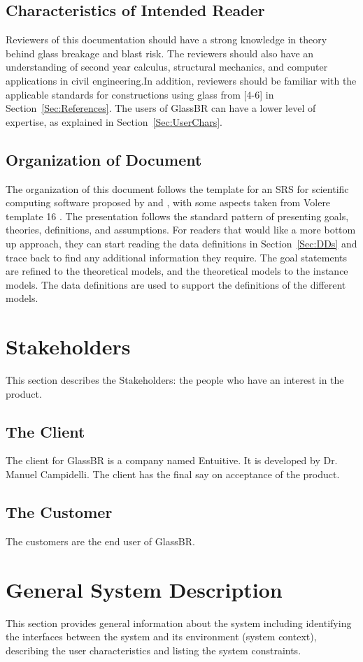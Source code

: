 \documentclass[12pt]{article}
\begin{document}
\subsection{Characteristics of Intended Reader}
\label{Sec:ReaderChars}
Reviewers of this documentation should have a strong knowledge in theory behind glass breakage and blast risk. The reviewers should also have an understanding of second year calculus, structural mechanics, and computer applications in civil engineering.In addition, reviewers should be familiar with the applicable standards for constructions using glass from {[}4-6{]} in Section~\ref{Sec:References}. The users of GlassBR can have a lower level of expertise, as explained in Section~\ref{Sec:UserChars}.
\subsection{Organization of Document}
\label{Sec:DocOrg}
The organization of this document follows the template for an SRS for scientific computing software proposed by \cite{koothoor2013} and \cite{smithLai2005}, with some aspects taken from Volere template 16 \cite{rbrtsn2012}. The presentation follows the standard pattern of presenting goals, theories, definitions, and assumptions. For readers that would like a more bottom up approach, they can start reading the data definitions in Section~\ref{Sec:DDs} and trace back to find any additional information they require.
The goal statements are refined to the theoretical models, and the theoretical models to the instance models. The data definitions are used to support the definitions of the different models.
\section{Stakeholders}
\label{Sec:Stakeholder}
This section describes the Stakeholders: the people who have an interest in the product.
\subsection{The Client}
\label{Sec:Client}
The client for GlassBR is a company named Entuitive. It is developed by Dr. Manuel Campidelli. The client has the final say on acceptance of the product.
\subsection{The Customer}
\label{Sec:Customer}
The customers are the end user of GlassBR.
\section{General System Description}
\label{Sec:GenSysDesc}
This section provides general information about the system including identifying the interfaces between the system and its environment (system context), describing the user characteristics and listing the system constraints.
\end{document}
